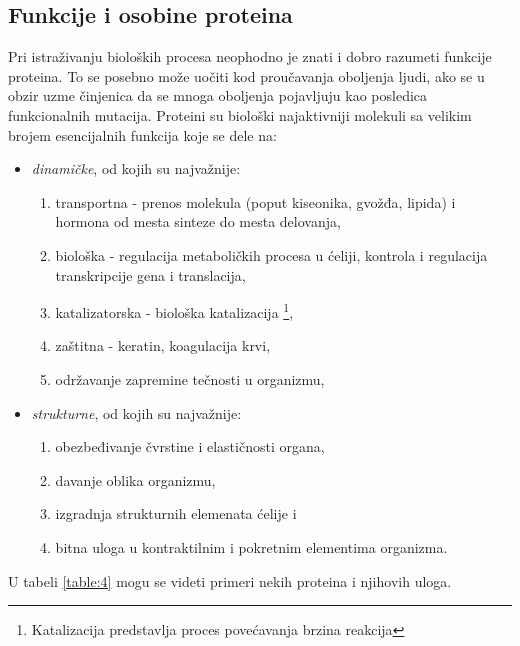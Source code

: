\subsection{Funkcije i osobine proteina}
Pri istraživanju bioloških procesa neophodno je znati i dobro razumeti funkcije proteina. To se posebno može uočiti kod proučavanja oboljenja ljudi, ako se u obzir uzme činjenica da se mnoga oboljenja pojavljuju kao posledica funkcionalnih mutacija. Proteini su biološki najaktivniji molekuli sa velikim brojem esencijalnih funkcija koje se dele na:
\begin{itemize}
\item \textit{dinamičke}, od kojih su najvažnije:
\begin{enumerate} 
\item transportna - prenos molekula (poput kiseonika, gvožđa, lipida) i hormona od mesta sinteze do mesta delovanja,
\item biološka - regulacija metaboličkih procesa u ćeliji, kontrola i regulacija transkripcije gena i translacija,
\item katalizatorska - biološka katalizacija \footnote{Katalizacija predstavlja proces povećavanja brzina reakcija},
\item zaštitna - keratin, koagulacija krvi,
\item održavanje zapremine tečnosti u organizmu,
\end{enumerate}
\item \textit{strukturne}, od kojih su najvažnije:
\begin{enumerate}
\item obezbeđivanje čvrstine i elastičnosti organa,
\item davanje oblika organizmu,
\item izgradnja strukturnih elemenata ćelije i
\item bitna uloga u kontraktilnim i pokretnim elementima organizma.
\end{enumerate}
\end{itemize} 
U tabeli \ref{table:4} mogu se videti primeri nekih proteina i njihovih uloga.


